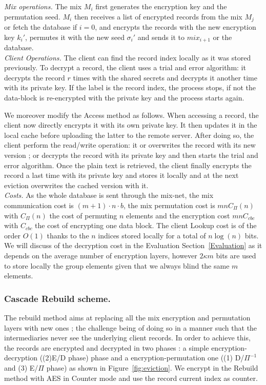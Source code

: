 \documentclass{llncs}
\begin{document}
\noindent\textit{Mix operations.} The mix $M_i$ first generates the encryption key and the permutation seed. $M_i$ then receives a list of encrypted records from the mix $M_j$ or fetch the database if $i=0$, and encrypts the records with the new encryption key $k_i'$, permutes it with the new seed $\sigma_{i}'$ and sends it to $mix_{i+1}$ or the database.\\

\noindent\textit{Client Operations.} The client can find the record index locally as it was stored previously. To decrypt a record, the client uses a trial and error algorithm: it  decrypts the record $r$ times with the shared secrets and decrypts it another time with its private key. If the label is the record index, the process stops, if not the data-block is re-encrypted with the private key and the process starts again.

We moreover modify the Access method as follows. When accessing a record, the client now directly encrypts it with its own private key. It then updates it in the local cache before uploading the latter to the remote server.
After doing so, the client perform the read/write operation: it or overwrites the record with its new version ; or decrypts the record with its private key and then starts the trial and error algorithm. Once the plain text is retrieved, the client finally encrypts the record a last time with its private key and stores it locally and at the next eviction overwrites the cached version with it. \\

\noindent\textit{Costs.}
As the whole database is sent through the mix-net, the mix communication cost is $ (m+1) \cdot n \cdot b$, the mix permutation cost is $mn C_{\Pi}(n)$ with $C_{\Pi}(n)$ the cost of permuting $n$ elements and the encryption cost $m n C_{cbc}$ with $C_{cbc}$ the cost of encrypting one data block. The client Lookup cost is of the order $O(1)$ thanks to the $n$ indices stored locally for a total of $n\log(n)$ bits. We will discuss of the decryption cost in the Evaluation Section~\ref{Evaluation} as it depends on the average number of encryption layers, however $2\kappa m$ bits are used to store locally the group elements given that we always blind the same $m$ elements.

\subsubsection{Cascade Rebuild scheme.} 

The rebuild method aims at replacing all the mix encryption and permutation layers with new ones ; the challenge being of doing so in a manner such that the intermediaries never see the underlying client records. 
In order to achieve this, the records are encrypted and decrypted in two phases : a simple encryption-decryption ((2)E/D phase) phase and a encryption-permutation one ((1) D/$\Pi^{-1}$ and (3) E/$\Pi$ phase) as shown in Figure~\ref{fig:eviction}. We encrypt in the Rebuild method with AES in Counter mode and use the record current index as counter.
\end{document}
